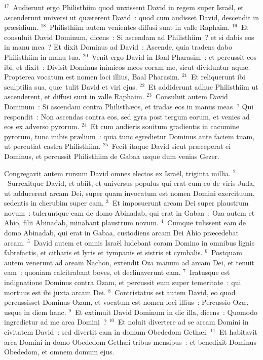 ${}^{17}$~Audierunt ergo Philisthiim quod unxissent David in regem super Isra\"el, et ascenderunt universi ut qu\ae rerent David~: quod cum audisset David, descendit in pr\ae sidium.
${}^{18}$~Philisthiim autem venientes diffusi sunt in valle Raphaim.
${}^{19}$~Et consuluit David Dominum, dicens~: Si ascendam ad Philisthiim~? et si dabis eos in manu mea~? Et dixit Dominus ad David~: Ascende, quia tradens dabo Philisthiim in manu tua.
${}^{20}$~Venit ergo David in Baal Pharasim~: et percussit eos ibi, et dixit~: Divisit Dominus inimicos meos coram me, sicut dividuntur aqu\ae . Propterea vocatum est nomen loci illius, Baal Pharasim.
${}^{21}$~Et reliquerunt ibi sculptilia sua, qu\ae\ tulit David et viri ejus.
${}^{22}$~Et addiderunt adhuc Philisthiim ut ascenderent, et diffusi sunt in valle Raphaim.
${}^{23}$~Consuluit autem David Dominum~: Si ascendam contra Philisth\ae os, et tradas eos in manus meas~? Qui respondit~: Non ascendas contra eos, sed gyra post tergum eorum, et venies ad eos ex adverso pyrorum.
${}^{24}$~Et cum audieris sonitum gradientis in cacumine pyrorum, tunc inibis pr\ae lium~: quia tunc egredietur Dominus ante faciem tuam, ut percutiat castra Philisthiim.
${}^{25}$~Fecit itaque David sicut pr\ae ceperat ei Dominus, et percussit Philisthiim de Gabaa usque dum venias Gezer.

\lettrine[lines=3,image=true,loversize=0.05,lraise=-0.03]{C}{}ongregavit autem rursum David omnes electos ex Isra\"el, triginta millia.
${}^{2}$~Surrexitque David, et abiit, et universus populus qui erat cum eo de viris Juda, ut adducerent arcam Dei, super quam invocatum est nomen Domini exercituum, sedentis in cherubim super eam.
${}^{3}$~Et imposuerunt arcam Dei super plaustrum novum~: tuleruntque eam de domo Abinadab, qui erat in Gabaa~: Oza autem et Ahio, filii Abinadab, minabant plaustrum novum.
${}^{4}$~Cumque tulissent eam de domo Abinadab, qui erat in Gabaa, custodiens arcam Dei Ahio pr\ae cedebat arcam.
${}^{5}$~David autem et omnis Isra\"el ludebant coram Domino in omnibus lignis fabrefactis, et citharis et lyris et tympanis et sistris et cymbalis.
${}^{6}$~Postquam autem venerunt ad aream Nachon, extendit Oza manum ad arcam Dei, et tenuit eam~: quoniam calcitrabant boves, et declinaverunt eam.
${}^{7}$~Iratusque est indignatione Dominus contra Ozam, et percussit eum super temeritate~: qui mortuus est ibi juxta arcam Dei.
${}^{8}$~Contristatus est autem David, eo quod percussisset Dominus Ozam, et vocatum est nomen loci illius~: Percussio Oz\ae , usque in diem hanc.
${}^{9}$~Et extimuit David Dominum in die illa, dicens~: Quomodo ingredietur ad me arca Domini~?
${}^{10}$~Et noluit divertere ad se arcam Domini in civitatem David~: sed divertit eam in domum Obededom Geth\ae i.
${}^{11}$~Et habitavit arca Domini in domo Obededom Geth\ae i tribus mensibus~: et benedixit Dominus Obededom, et omnem domum ejus.


